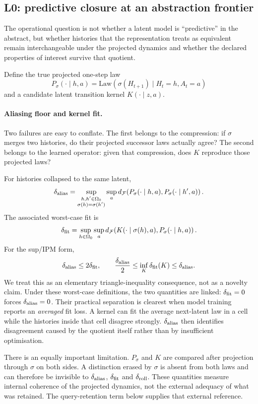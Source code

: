\documentclass[10pt]{article}
\newcommand{\dF}{d_{\mathcal F}}
\begin{document}
\subsection{L0: predictive closure at an abstraction frontier}

The operational question is not whether a latent model is ``predictive'' in the abstract, but whether histories that the representation treats as equivalent remain interchangeable under the projected dynamics and whether the declared properties of interest survive that quotient.

Define the true projected one-step law
\[
P_\sigma(\cdot\mid h,a)
=
\mathrm{Law}\!\left(\sigma(H_{t+1})\mid H_t=h,A_t=a\right)
\]
and a candidate latent transition kernel $K(\cdot\mid z,a)$.

\paragraph{Aliasing floor and kernel fit.}
Two failures are easy to conflate. The first belongs to the compression: if $\sigma$ merges two histories, do their projected successor laws actually agree? The second belongs to the learned operator: given that compression, does $K$ reproduce those projected laws?

For histories collapsed to the same latent,
\[
\delta_{\rm alias}
=
\sup_{\substack{h,h'\in\Omega_0\\\sigma(h)=\sigma(h')}}
\sup_a
\dF\!\left(P_\sigma(\cdot\mid h,a),P_\sigma(\cdot\mid h',a)\right).
\]
The associated worst-case fit is
\[
\delta_{\rm fit}
=
\sup_{h\in\Omega_0}\sup_a
\dF\!\left(K(\cdot\mid\sigma(h),a),P_\sigma(\cdot\mid h,a)\right).
\]
For the sup/IPM form,
\[
\delta_{\rm alias}\le 2\delta_{\rm fit},
\qquad
\frac{\delta_{\rm alias}}2
\le \inf_K\delta_{\rm fit}(K)
\le \delta_{\rm alias}.
\]
We treat this as an elementary triangle-inequality consequence, not as a novelty claim. Under these worst-case definitions, the two quantities are linked: $\delta_{\rm fit}=0$ forces $\delta_{\rm alias}=0$. Their practical separation is clearest when model training reports an \emph{averaged} fit loss. A kernel can fit the average next-latent law in a cell while the histories inside that cell disagree strongly. $\delta_{\rm alias}$ then identifies disagreement caused by the quotient itself rather than by insufficient optimisation.

There is an equally important limitation. $P_\sigma$ and $K$ are compared after projection through $\sigma$ on both sides. A distinction erased by $\sigma$ is absent from both laws and can therefore be invisible to $\delta_{\rm alias}$, $\delta_{\rm fit}$ and $\delta_{\rm roll}$. These quantities measure internal coherence of the projected dynamics, not the external adequacy of what was retained. The query-retention term below supplies that external reference.
\end{document}
